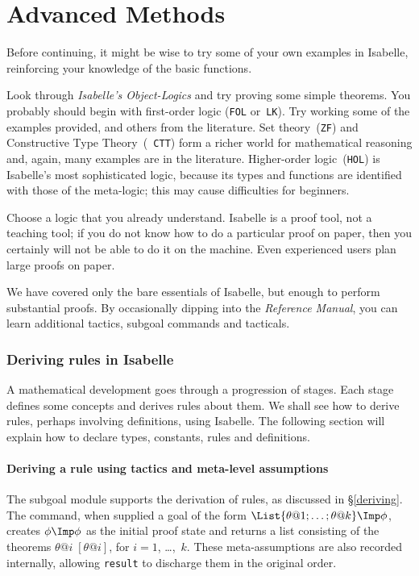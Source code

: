 \part{Advanced Methods}
Before continuing, it might be wise to try some of your own examples in
Isabelle, reinforcing your knowledge of the basic functions.

Look through {\em Isabelle's Object-Logics\/} and try proving some simple
theorems.  You probably should begin with first-order logic ({\tt FOL}
or~{\tt LK}).  Try working some of the examples provided, and others from
the literature.  Set theory~({\tt ZF}) and Constructive Type Theory~({\tt
  CTT}) form a richer world for mathematical reasoning and, again, many
examples are in the literature.  Higher-order logic~({\tt HOL}) is
Isabelle's most sophisticated logic, because its types and functions are
identified with those of the meta-logic; this may cause difficulties for
beginners.

Choose a logic that you already understand.  Isabelle is a proof
tool, not a teaching tool; if you do not know how to do a particular proof
on paper, then you certainly will not be able to do it on the machine.
Even experienced users plan large proofs on paper.

We have covered only the bare essentials of Isabelle, but enough to perform
substantial proofs.  By occasionally dipping into the {\em Reference
Manual}, you can learn additional tactics, subgoal commands and tacticals.


\section{Deriving rules in Isabelle}
A mathematical development goes through a progression of stages.  Each
stage defines some concepts and derives rules about them.  We shall see how
to derive rules, perhaps involving definitions, using Isabelle.  The
following section will explain how to declare types, constants, rules and
definitions.


\subsection{Deriving a rule using tactics and meta-level assumptions} 
\label{deriving-example}

The subgoal module supports the derivation of rules, as discussed in
\S\ref{deriving}.  The  command, when supplied a goal of the
form $\List{\theta@1; \ldots; \theta@k} \Imp \phi$, creates $\phi\Imp\phi$
as the initial proof state and returns a list consisting of the theorems
${\theta@i\;[\theta@i]}$, for $i=1$, \ldots,~$k$.  These meta-assumptions
are also recorded internally, allowing {\tt result} to discharge them
in the original order.


